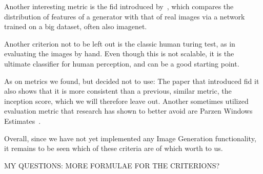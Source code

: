 Another interesting metric is the \ac{fid} introduced by~\cite{fid}, which compares the distribution of features of
a generator with that of real images via a network trained on a big dataset, often also imagenet.

Another criterion not to be left out is the classic human turing test, as in evaluating the images by hand.
Even though this is not scalable, it is the ultimate classifier for human perception, and can be a good starting
point.

As on metrics we found, but decided not to use: The paper that introduced \ac{fid} it also shows that it is more
consistent than a previous, similar metric, the inception score, which we will therefore leave out.
Another sometimes utilized evaluation metric that research has shown to better avoid are Parzen Windows Estimates~\cite{note_on_eval}.

Overall, since we have not yet implemented any Image Generation functionality, it remains to be seen which of these
criteria are of which worth to us.

MY QUESTIONS: MORE FORMULAE FOR THE CRITERIONS?
